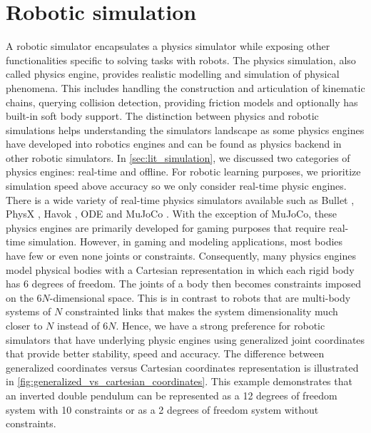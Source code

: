 \documentclass[\home/main.tex]{subfiles}
\begin{document}

\section{Robotic simulation}

A robotic simulator encapsulates a physics simulator while exposing other functionalities specific to solving tasks with robots. The physics simulation, also called physics engine, provides realistic modelling and simulation of physical phenomena. This includes handling the construction and articulation of kinematic chains, querying collision detection, providing friction models and optionally has built-in soft body support. 
The distinction between physics and robotic simulations helps understanding the simulators landscape as some physics engines have developed into robotics engines and can be found as physics backend in other robotic simulators.
In \cref{sec:lit_simulation}, we discussed two categories of physics engines: real-time and offline. For robotic learning purposes, we prioritize simulation speed above accuracy so we only consider real-time physic engines. There is a wide variety of real-time physics simulators available such as Bullet \autocite{Bullet}, PhysX \autocite{PhysX}, Havok \autocite{Havok}, ODE \autocite{ODE} and MuJoCo \autocite{Mujoco}. 
With the exception of MuJoCo, these physics engines are primarily developed for gaming purposes that require real-time simulation. However, in gaming and modeling applications, most bodies have few or even none joints or constraints. Consequently, many physics engines model physical bodies with a Cartesian representation in which each rigid body has 6 degrees of freedom. The joints of a body then becomes constraints imposed on the $6N$-dimensional space. This is in contrast to robots that are multi-body systems of $N$ constrainted links that makes the system dimensionality much closer to $N$ instead of $6N$. Hence, we have a strong preference for robotic simulators that have underlying physic engines using generalized joint coordinates that provide better stability, speed and accuracy. The difference between generalized coordinates versus Cartesian coordinates representation is illustrated in \cref{fig:generalized_vs_cartesian_coordinates}. This example demonstrates that an inverted double pendulum can be represented as a 12 degrees of freedom system with 10 constraints or as a 2 degrees of freedom system without constraints. 
\end{document}
